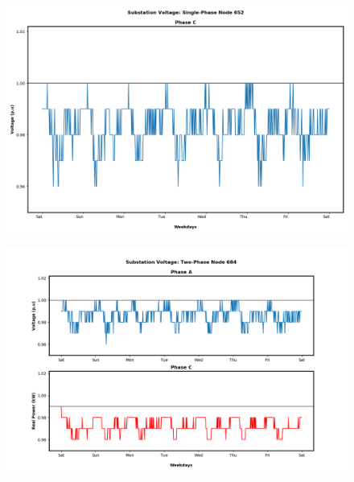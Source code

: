 \begin{figure}[H]
    \centering
    \includegraphics[width=1.1\columnwidth]{Pictures/twenty_single_phase_652_volt.png}
    \caption{ }
\end{figure}

\newpage

\begin{figure}[H]
    \centering
    \includegraphics[width=1.1\columnwidth]{Pictures/twenty_two_phase_684_volt.png}
    \caption{ }
\end{figure}

\newpage

